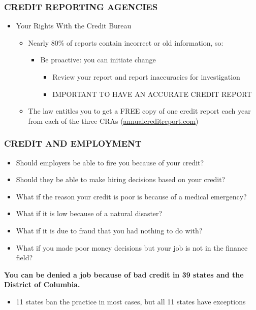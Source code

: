 \documentclass[12pt]{article}
\begin{document}
            \subsubsection{CREDIT REPORTING AGENCIES}
                \begin{itemize}
                    \item Your Rights With the Credit Bureau
                        \begin{itemize}
                            \item Nearly 80\% of reports contain incorrect or old information, so:
                                \begin{itemize}
                                    \item Be proactive: you can initiate change
                                        \begin{itemize}
                                            \item Review your report and report inaccuracies for investigation
                                            \item IMPORTANT TO HAVE AN ACCURATE CREDIT REPORT
                                        \end{itemize}
                                \end{itemize}
                            \item The law entitles you to get a FREE copy of one credit report each year from each of the three
                                CRAs (\href{https://www.annualcreditreport.com/index.action}{annualcreditreport.com})
                        \end{itemize}
                \end{itemize}
            \subsubsection{CREDIT AND EMPLOYMENT}
                \begin{itemize}
                    \item Should employers be able to fire you because of your credit?
                    \item Should they be able to make hiring decisions based on your credit?
                    \item What if the reason your credit is poor is because of a medical emergency?
                    \item What if it is low because of a natural disaster?
                    \item What if it is due to fraud that you had nothing to do with?
                    \item What if you made poor money decisions but your job is not in the finance field?
                \end{itemize}
                \textbf{You can be denied a job because of bad credit in 39 states and the District of Columbia.}
                    \begin{itemize}
                        \item 11 states ban the practice in most cases, but all 11 states have exceptions
                    \end{itemize}
\end{document}
